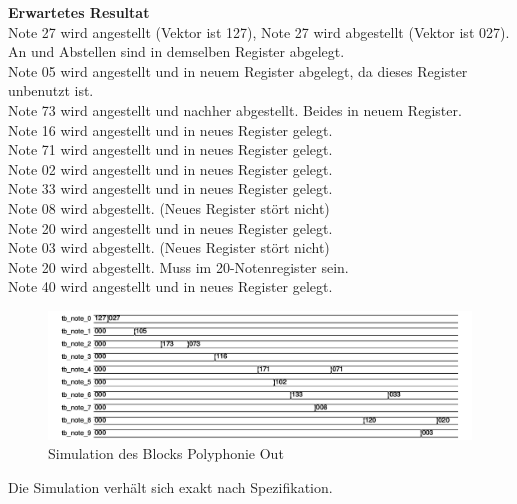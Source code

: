 \textbf{Erwartetes Resultat}\\
Note 27 wird angestellt (Vektor ist 127), Note 27 wird abgestellt (Vektor ist 027). An und Abstellen sind in demselben Register abgelegt.\\
Note 05 wird angestellt und in neuem Register abgelegt, da dieses Register unbenutzt ist.\\
Note 73 wird angestellt und nachher abgestellt. Beides in neuem Register.\\
Note 16 wird angestellt und in neues Register gelegt.\\
Note 71 wird angestellt und in neues Register gelegt.\\
Note 02 wird angestellt und in neues Register gelegt.\\
Note 33 wird angestellt und in neues Register gelegt.\\
Note 08 wird abgestellt. (Neues Register stört nicht)\\
Note 20 wird angestellt und in neues Register gelegt.\\
Note 03 wird abgestellt. (Neues Register stört nicht)\\
Note 20 wird abgestellt. Muss im 20-Notenregister sein.\\
Note 40 wird angestellt und in neues Register gelegt.\\

\begin{figure}[H]
	\centering
	\includegraphics[width=1\textwidth]{images/midi_interface/tb_polyphonie.png}
	\caption{Simulation des Blocks Polyphonie Out }
	\label{fig.polyphnie_simulation}
\end{figure}

Die Simulation verhält sich exakt nach Spezifikation.